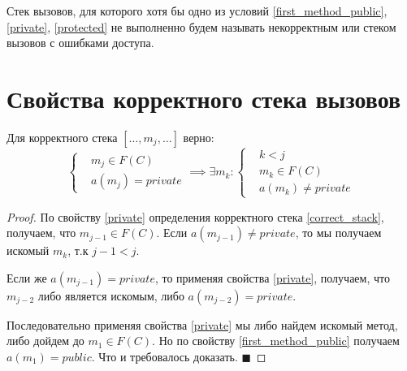 \documentclass[graybox]{svmult}
\begin{document}
\begin{definition}
Стек вызовов, для которого хотя бы одно из условий \ref{first_method_public}, \ref{private}, \ref{protected} не выполненно будем называть некорректным или стеком вызовов с ошибками доступа.
\end{definition}

\section{Свойства корректного стека вызовов}
\label{sec:2}

\begin{theorem}
\label{not_private_before_private}
Для корректного стека $[\dots, m_j, \dots]$ верно:
\begin{equation}
	\left\{	
		\begin{aligned}
			&m_j \in F(C)\\
			&a(m_j) = private
		\end{aligned}
	\right.
	\implies
	\exists m_k: 
	\left\{
		\begin{aligned}
			&k < j \\
			&m_k \in F(C) \\
			&a(m_k) \neq private
		\end{aligned}
	\right.
\end{equation}
\end{theorem}
\begin{proof}
По свойству \ref{private} определения корректного стека \ref{correct_stack}, получаем, что $m_{j-1} \in F(C)$. Если $a(m_{j-1}) \neq private$, то мы получаем искомый $m_k$, т.к $j - 1 < j$.

Если же $a(m_{j-1}) = private$, то применяя свойства \ref{private}, получаем, что $m_{j-2}$ либо является искомым, либо $a(m_{j-2}) = private$.

Последовательно применяя свойства \ref{private} мы либо найдем искомый метод, либо дойдем до $m_1 \in F(C)$. Но по свойству \ref{first_method_public} получаем $a(m_1) = public$. 
Что и требовалось доказать. $\blacksquare$

\end{proof}
\end{document}
